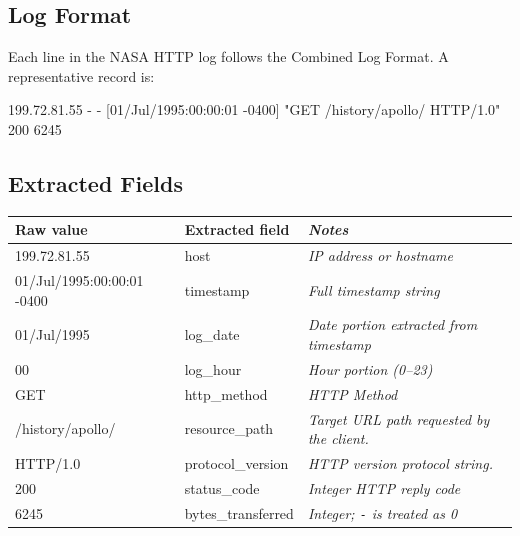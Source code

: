 \documentclass[11pt,a4paper]{article}
\begin{document}
\subsection{Log Format}

Each line in the NASA HTTP log follows the Combined Log Format. A representative record is:

\begin{tcolorbox}[basebox, 
                  colback=DarkGray!90, colframe=DarkGray,
                  fontupper=\ttfamily\footnotesize\color{white}] %
199.72.81.55 - - [01/Jul/1995:00:00:01 -0400] "GET /history/apollo/ HTTP/1.0" 200 6245
\end{tcolorbox}
\newpage
\subsection{Extracted Fields}
\vspace{4pt}
\begin{center}
\renewcommand{\arraystretch}{1.35}
\begin{tabular}{@{} >{\ttfamily\small}l >{\small}l >{\small\itshape}l @{}}
\toprule
\textnormal{\textbf{Raw value}} & \textbf{Extracted field} & \textbf{Notes} \\
\midrule
199.72.81.55              & host             & IP address or hostname \\
01/Jul/1995:00:00:01 -0400 & timestamp        & Full timestamp string \\
01/Jul/1995               & log\_date        & Date portion extracted from timestamp \\
00                        & log\_hour        & Hour portion (0--23) \\
GET                       & http\_method     & HTTP Method \\
/history/apollo/          & resource\_path   & Target URL path requested by the client. \\
HTTP/1.0                  & protocol\_version & HTTP version protocol string. \\
200                       & status\_code     & Integer HTTP reply code \\
6245                      & bytes\_transferred & Integer; \texttt{-} is treated as 0 \\
\bottomrule
\end{tabular}
\end{center}
\end{document}

